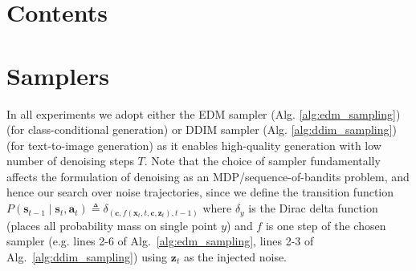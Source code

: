 \documentclass{article}
\begin{document}



\newpage



\appendix

\section*{Contents}
\vspace{-1em}

\startcontents[sections]



\clearpage


\section{Samplers}

In all experiments we adopt either the EDM sampler (Alg. \autoref{alg:edm_sampling}) \citep{karras2022elucidatingdesignspacediffusionbased} (for class-conditional generation) or DDIM sampler (Alg. \autoref{alg:ddim_sampling}) \citep{song2022denoisingdiffusionimplicitmodels} (for text-to-image generation) as it enables high-quality generation with low number of denoising steps $T$. Note that the choice of sampler fundamentally affects the formulation of denoising as an MDP/sequence-of-bandits problem, and hence our search over noise trajectories, since we define the transition function $P(\mathbf{s}_{t-1} \mid \mathbf{s}_t, \mathbf{a}_t) \triangleq \delta_{(\mathbf{c}, f(\mathbf{x}_t, t, \mathbf{c}, \mathbf{z}_t), t-1)}$ where $\delta_y$ is the Dirac delta function (places all probability mass on single point $y$) and $f$ is one step of the chosen sampler (e.g. lines 2-6 of Alg.~\ref{alg:edm_sampling}, lines  2-3 of Alg.~\ref{alg:ddim_sampling}) using $\mathbf{z}_t$ as the injected noise.
\end{document}
